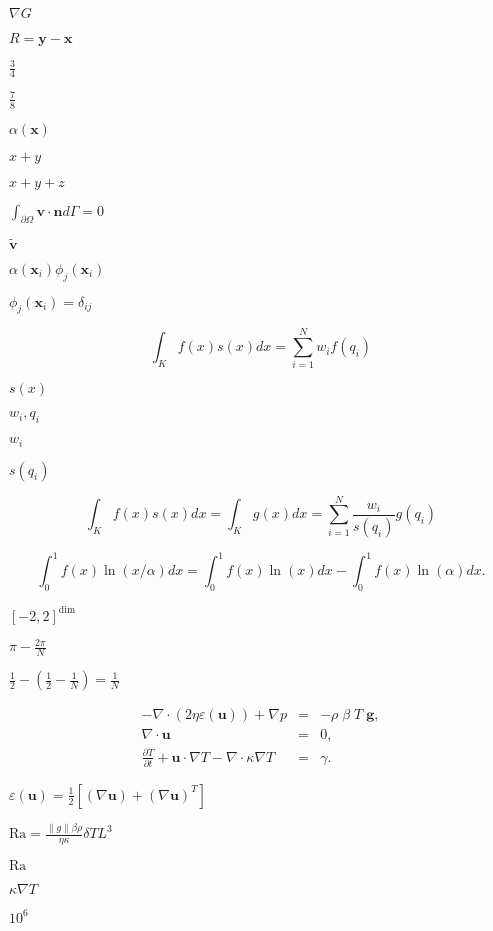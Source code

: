\documentclass{article}
\begin{document}
$\nabla G$
\pagebreak

$R = \mathbf{y}-\mathbf{x}$
\pagebreak

$\frac 34$
\pagebreak

$\frac 78$
\pagebreak

$\alpha(\mathbf x)$
\pagebreak

$x+y$
\pagebreak

$x+y+z$
\pagebreak

$\int_{\partial\Omega} \mathbf{v}\cdot \mathbf{n} d \Gamma = 0$
\pagebreak

$\mathbf{\tilde v}$
\pagebreak

$\alpha(\mathbf{x}_i) \phi_j(\mathbf{x}_i)$
\pagebreak

$\phi_j(\mathbf{x}_i)=\delta_{ij}$
\pagebreak

\[ \int_K f(x) s(x) dx = \sum_{i=1}^N w_i f(q_i) \]
\pagebreak

$s(x)$
\pagebreak

$w_i,q_i$
\pagebreak

$w_i$
\pagebreak

$s(q_i)$
\pagebreak

\[ \int_K f(x) s(x) dx = \int_K g(x) dx = \sum_{i=1}^N \frac{w_i}{s(q_i)} g(q_i) \]
\pagebreak

\[ \int_0^1 f(x)\ln(x/\alpha) dx = \int_0^1 f(x)\ln(x) dx - \int_0^1 f(x) \ln(\alpha) dx. \]
\pagebreak

$[-2,2]^{\text{dim}}$
\pagebreak

$\pi-\frac {2\pi}{N}$
\pagebreak

$\frac 12 - (\frac 12 -\frac 1N) = \frac 1N$
\pagebreak

\begin{eqnarray*} -\nabla \cdot (2 \eta \varepsilon ({\mathbf u})) + \nabla p &=& -\rho\; \beta \; T\; \mathbf{g}, \\ \nabla \cdot {\mathbf u} &=& 0, \\ \frac{\partial T}{\partial t} + {\mathbf u} \cdot \nabla T - \nabla \cdot \kappa \nabla T &=& \gamma. \end{eqnarray*}
\pagebreak

$\varepsilon ({\mathbf u}) = \frac 12 [(\nabla{\mathbf u}) + (\nabla {\mathbf u})^T]$
\pagebreak

$\mathrm{Ra}=\frac{\|g\| \beta \rho}{\eta \kappa} \delta T L^3$
\pagebreak

$\mathrm{Ra}$
\pagebreak

$\kappa\nabla T$
\pagebreak

$10^6$
\pagebreak
\end{document}
